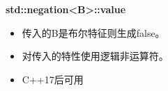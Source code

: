 \textbf{std::negation<B>::value}

\begin{itemize}
\item 
传入的B是布尔特征则生成false。

\item 
对传入的特性使用逻辑非运算符。

\item 
C++17后可用
\end{itemize}












